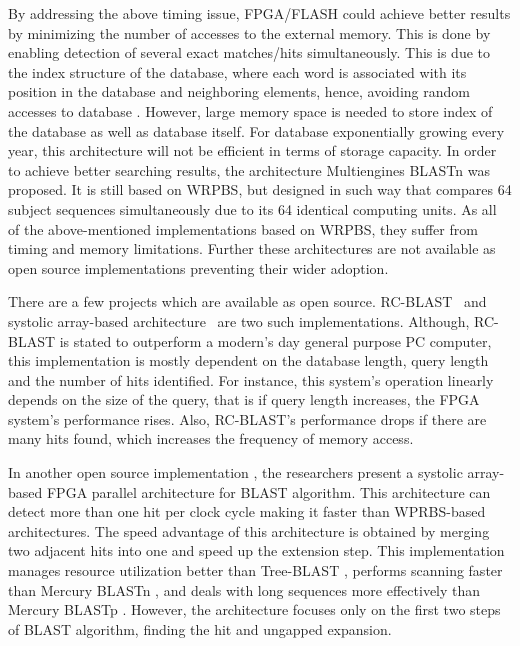 By addressing the above timing issue, FPGA/FLASH \cite{lavenier2007reconfigurable} could achieve better results by minimizing the number of accesses to the external memory. 
This is done by enabling detection of several exact matches/hits simultaneously. 
This is due to the index structure of the database, where each word is associated with its position in the database and neighboring elements, hence, avoiding random accesses to database \cite{guo2012systolic}. 
However, large memory space is needed to store index of the database as well as database itself. 
For database exponentially growing every year, this architecture will not be efficient in terms of storage capacity. 
In order to achieve better searching results, the architecture Multiengines BLASTn \cite{sotiriades2007design} was proposed. 
It is still based on WRPBS, but designed in such way that compares 64 subject sequences simultaneously due to its 64 identical computing units. 
As all of the above-mentioned implementations based on WRPBS, they suffer from timing and memory limitations. 
Further these architectures are not available as open source implementations preventing their wider adoption.

There are a few projects which are available as open source. 
RC-BLAST~\cite{datta2009} and  systolic array-based architecture~\cite{guo2012open} are two such implementations.
Although, RC-BLAST is stated to outperform a modern's day general purpose PC computer, this implementation is mostly dependent on the database length, query length and the number of hits identified. 
For instance, this system's operation linearly depends on the size of the query, that is if query length increases, the FPGA system's performance rises. 
Also, RC-BLAST's performance drops if there are many hits found, which increases the frequency of memory access.

In another open source implementation \cite{guo2012open}, the researchers present a systolic array-based FPGA parallel architecture for BLAST algorithm. 
This architecture can detect more than one hit per clock cycle making it faster than WPRBS-based architectures. 
The speed advantage of this architecture is obtained by merging two adjacent hits into one and speed up the extension step. 
This implementation manages resource utilization better than Tree-BLAST \cite{herbordt2006single}, performs scanning faster than Mercury BLASTn \cite{buhler2007mercury}, and deals with long sequences more effectively than Mercury BLASTp \cite{harris2007banded}. 
However, the architecture focuses only on the first two steps of BLAST algorithm, finding the hit and ungapped expansion. 

